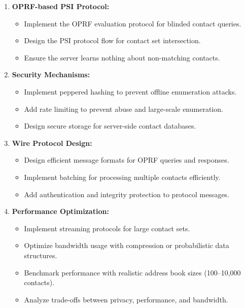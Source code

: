 \documentclass[10pt,a4paper,american]{exam}
\begin{document}
\begin{enumerate}
	\item \textbf{OPRF-based PSI Protocol:}
	      \begin{itemize}
		      \item Implement the OPRF evaluation protocol for blinded contact queries.
		      \item Design the PSI protocol flow for contact set intersection.
		      \item Ensure the server learns nothing about non-matching contacts.
	      \end{itemize}

	\item \textbf{Security Mechanisms:}
	      \begin{itemize}
		      \item Implement peppered hashing to prevent offline enumeration attacks.
		      \item Add rate limiting to prevent abuse and large-scale enumeration.
		      \item Design secure storage for server-side contact databases.
	      \end{itemize}

	\item \textbf{Wire Protocol Design:}
	      \begin{itemize}
		      \item Design efficient message formats for OPRF queries and responses.
		      \item Implement batching for processing multiple contacts efficiently.
		      \item Add authentication and integrity protection to protocol messages.
	      \end{itemize}

	\item \textbf{Performance Optimization:}
	      \begin{itemize}
		      \item Implement streaming protocols for large contact sets.
		      \item Optimize bandwidth usage with compression or probabilistic data structures.
		      \item Benchmark performance with realistic address book sizes (100--10,000 contacts).
		      \item Analyze trade-offs between privacy, performance, and bandwidth.
	      \end{itemize}
\end{enumerate}
\end{document}
